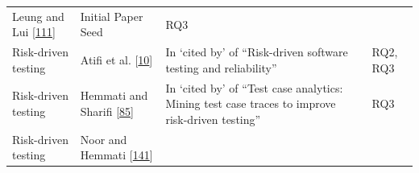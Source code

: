 \documentclass[]{book}
\begin{document}
\begin{longtable}[]{@{}llll@{}}
\begin{minipage}[t]{0.16\columnwidth}
Leung and Lui {[}\protect\hyperlink{ref-leung2015testing}{111}{]}\strut
\end{minipage} & \begin{minipage}[t]{0.50\columnwidth}\raggedright\strut
Initial Paper Seed\strut
\end{minipage} & \begin{minipage}[t]{0.04\columnwidth}\raggedright\strut
RQ3\strut
\end{minipage}\tabularnewline
\begin{minipage}[t]{0.18\columnwidth}\raggedright\strut
Risk-driven testing\strut
\end{minipage} & \begin{minipage}[t]{0.16\columnwidth}\raggedright\strut
Atifi et al. {[}\protect\hyperlink{ref-atifi2017}{10}{]}\strut
\end{minipage} & \begin{minipage}[t]{0.50\columnwidth}\raggedright\strut
In `cited by' of ``Risk-driven software testing and reliability''\strut
\end{minipage} & \begin{minipage}[t]{0.04\columnwidth}\raggedright\strut
RQ2, RQ3\strut
\end{minipage}\tabularnewline
\begin{minipage}[t]{0.18\columnwidth}\raggedright\strut
Risk-driven testing\strut
\end{minipage} & \begin{minipage}[t]{0.16\columnwidth}\raggedright\strut
Hemmati and Sharifi {[}\protect\hyperlink{ref-hemmati2018}{85}{]}\strut
\end{minipage} & \begin{minipage}[t]{0.50\columnwidth}\raggedright\strut
In `cited by' of ``Test case analytics: Mining test case traces to
improve risk-driven testing''\strut
\end{minipage} & \begin{minipage}[t]{0.04\columnwidth}\raggedright\strut
RQ3\strut
\end{minipage}\tabularnewline
\begin{minipage}[t]{0.18\columnwidth}\raggedright\strut
Risk-driven testing\strut
\end{minipage} & \begin{minipage}[t]{0.16\columnwidth}\raggedright\strut
Noor and Hemmati {[}\protect\hyperlink{ref-noor2015test}{141}{]}\strut
\end{minipage} & \begin{minipage}[t]{0.50\columnwidth}\raggedright\strut

\end{minipage}
\end{longtable}
\end{document}
